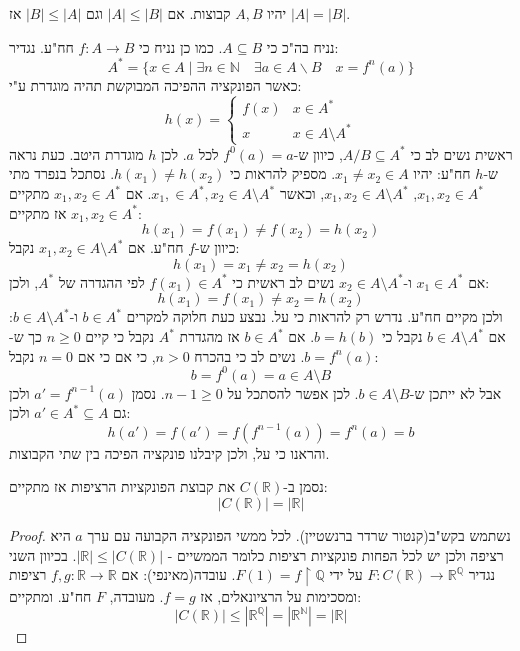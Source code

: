 \documentclass{tstextbook}
\begin{document}
\begin{theorem}
יהיו \(A, B\) קבוצות.  אם \(|A|\leq |B|\) וגם \(|B|\leq |A|\) אז \(|A|=|B|\).

\end{theorem}
נניח בה"כ כי \(A\subseteq B\). כמו כן נניח כי \(f:A\to B\) חח"ע. נגדיר:
$$ A^*=\{x\in A\mid\exists n\in\mathbb{N}\quad\exists a\in A\backslash B\quad x=f^n\left(a\right)\}$$
כאשר הפונקציה ההפיכה המבוקשת תהיה מוגדרת ע"י:
$$h(x)=\begin{cases}f(x) & x \in A^{*} \\x & x \in A \setminus  A^{*}
\end{cases}$$
ראשית נשים לב כי \(A / B \subseteq A^{*}\), כיוון ש-\(f^{0}(a)=a\) לכל \(a\). לכן \(h\) מוגדרת היטב.
כעת נראה ש-\(h\) חח"ע:
יהיו \(x_{1}\neq x_{2} \in A\). מספיק להראות כי \(h(x_{1})\neq h(x_{2})\). נסתכל בנפרד מתי \(x_{1},x_{2} \in A^{*}\), \(x_{1},x_{2} \in A \setminus A^{*}\), וכאשר \(x_{1},\in A^{*},x_{2} \in A\setminus A^{*}\).
אם \(x_{1},x_{2} \in A^{*}\) מתקיים \(x_{1},x_{2}\in A^{*}\) אז מתקיים:
$$h(x_{1})=f(x_{1})\neq f(x_{2})=h(x_{2})$$
כיוון ש-\(f\) חח"ע. אם \(x_{1},x_{2} \in A \setminus A^{*}\) נקבל:
$$h(x_{1})=x_{1}\neq x_{2}=h(x_{2})$$
אם \(x_{1} \in A^{*}\) ו-\(x_{2} \in A\setminus A^{*}\) נשים לב ראשית כי \(f(x_{1})\in A^{*}\) לפי ההגדרה של \(A^{*}\), ולכן:
$$h(x_{1})=f(x_{1})\neq x_{2}=h(x_{2})$$
ולכן מקיים חח"ע. נדרש רק להראות כי על. נבצע כעת חלוקה למקרים \(b \in A^{*}\) ו-\(b \in A\setminus A^{*}\):
אם \(b \in A \setminus A^{*}\) נקבל כי \(b=h(b)\). אם \(b \in A^{*}\) אז מהגדרת \(A^{*}\) נקבל כי קיים \(n\geq 0\) כך ש-\(b=f^{n}(a)\). נשים לב כי בהכרח \(n> 0\), כי אם כי אם \(n=0\) נקבל:
$$b=f^{0}(a)=a \in A\setminus  B$$
אבל לא ייתכן ש-\(b \in A\setminus B\). לכן אפשר להסתכל על \(n-1\geq 0\). נסמן \(a'=f^{n-1}(a)\) ולכן גם \(a' \in A^{*}\subseteq A\) ולכן:
$$h(a')=f(a')=f(f^{n-1}(a))=f^{n}(a)=b$$
והראנו כי על, ולכן קיבלנו פונקציה הפיכה בין שתי הקבוצות.

\begin{proposition}
נסמן ב-\(C\left( \mathbb{R} \right)\) את קבוצת הפונקציות הרציפות אז מתקיים:
$$\left\lvert  C\left( \mathbb{R} \right)  \right\rvert =\left\lvert  \mathbb{R}  \right\rvert $$

\end{proposition}
\begin{proof}
נשתמש בקש"ב(קנטור שרדר ברנשטיין). לכל ממשי הפונקציה הקבועה עם ערך \(a\) היא רציפה ולכן יש לכל הפחות פונקציות רציפות כלומר הממשיים - \(\left\lvert  \mathbb{R}  \right\rvert\leq \left\lvert  C\left( \mathbb{R} \right)  \right\rvert\).
בכיוון השני נגדיר \(F:C\left( \mathbb{R} \right)\to \mathbb{R}^\mathbb{Q}\) על ידי \(F(1)=f\upharpoonright \mathbb{Q}\).
עובדה(מאינפי): אם \(f,g:\mathbb{R}\to \mathbb{R}\) רציפות ומסכימות על הרציונאלים, אז \(f=g\). 
מעובדה, \(F\) חח"ע. ומתקיים:
$$\left\lvert  C\left( \mathbb{R} \right)  \right\rvert \leq \left\lvert  \mathbb{R}^\mathbb{Q}   \right\rvert =\left\lvert  \mathbb{R}^\mathbb{N}  \right\rvert =\lvert \mathbb{R} \rvert $$

\end{proof}
\end{document}
